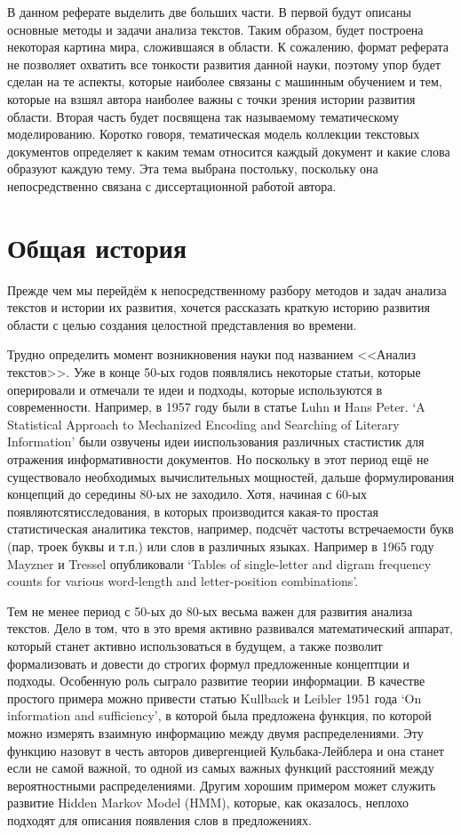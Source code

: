 \documentclass[a4paper,14pt]{extarticle}
\begin{document}
В данном реферате выделить две больших части. В первой будут описаны основные методы и задачи анализа текстов. Таким образом, будет построена некоторая картина мира, сложившаяся в области. К сожалению, формат реферата не позволяет охватить все тонкости развития данной науки, поэтому упор будет сделан на те аспекты, которые наиболее связаны с машинным обучением и тем, которые на взшял автора наиболее важны с точки зрения истории развития области. Вторая часть будет посвящена так называемому тематическому моделированию. Коротко говоря, тематическая модель коллекции текстовых документов определяет к каким темам относится каждый документ и какие слова образуют каждую тему. Эта тема выбрана постольку, поскольку она непосредственно связана с диссертационной работой автора. 


\section{Общая история}
Прежде чем мы перейдём к непосредственному разбору методов и задач анализа текстов и истории их развития, хочется рассказать краткую историю развития области с целью создания целостной представления во времени.
 
Трудно определить момент возникновения науки под названием <<Анализ текстов>>.  Уже в конце 50-ых годов появлялись некоторые статьи, которые оперировали и отмечали те идеи и подходы, которые используются в современности. Например, в 1957 году были  в статье Luhn и Hans Peter. `A Statistical Approach to Mechanized Encoding and Searching of Literary Information'  были озвучены идеи ииспользования различных стастистик для отражения информативности документов. Но поскольку в этот период ещё не существовало необходимых вычислительных мощностей, дальше формулирования концепций до середины 80-ых не заходило.  Хотя, начиная с 60-ых появляютсятисследования, в которых производится какая-то простая статистическая аналитика текстов, например, подсчёт частоты встречаемости букв (пар, троек буквы и т.п.) или слов в различных языках. Например в 1965 году Mayzner и Tressel опубликовали `Tables of single-letter and digram frequency counts for various word-length and letter-position combinations'.

Тем не менее период с 50-ых до 80-ых весьма важен для развития анализа текстов. Дело в том, что в это время активно развивался математический аппарат, который станет активно использоваться в будущем, а также позволит формализовать и довести до строгих формул предложенные концептции и подходы. Особенную роль сыграло развитие теории информации. В качестве простого примера можно привести статью Kullback и Leibler 1951 года `On information and sufficiency', в которой была предложена функция, по которой можно измерять взаимную информацию между двумя распределениями. Эту функцию назовут в честь авторов дивергенцией Кульбака-Лейблера и она станет если не самой важной, то одной из самых важных функций расстояний между вероятностными распределениями. Другим хорошим примером может служить развитие Hidden Markov Model (HMM), которые, как оказалось, неплохо подходят для описания появления слов в предложениях.
\end{document}
